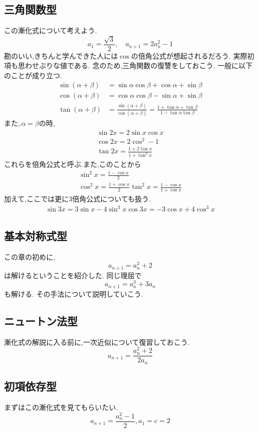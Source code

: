 \documentclass[dvipdfmx,a4paper,11pt,fleqn,openany]{jsbook}
\begin{document}
  \subsection{三角関数型}
    この漸化式について考えよう.
    \[
      a_1=\frac{\sqrt{3}}{2},\quad a_{n+1}=2a_n^2-1
    \]
    勘のいい,きちんと学んできた人には$\cos$の倍角公式が想起されるだろう.
    実際初項も思わせぶりな値である.
    念のため,三角関数の復讐をしておこう.
    一般に以下のことが成り立つ.
    \begin{align*}
      \sin (\alpha+\beta) &=\sin \alpha \cos \beta +\cos \alpha + \sin \beta\\
      \cos (\alpha+\beta) &=\cos \alpha \cos \beta -\sin \alpha + \sin \beta\\
      \tan (\alpha+\beta) &=\frac{\sin (\alpha+\beta)}{\cos (\alpha+\beta)}=\frac{1+\tan\alpha+\tan \beta}{1-\tan\alpha\tan\beta}
    \end{align*}
    また,\,$\alpha=\beta$の時,
    \begin{align*}
      \sin 2x =2\sin x \cos x\\
      \cos 2x =2\cos^2 -1\\
      \tan 2x =\frac{1+2\tan x}{1+\tan^2 x}
    \end{align*}
    これらを倍角公式と呼ぶ.また,このことから
    \begin{align*}
      \sin^2 x= \frac{1-\cos x}{2}\\
      \cos^2 x= \frac{1+\cos x}{2}
      \tan^2 x=\frac{1-\cos x}{1+\cos x}
    \end{align*}
    加えて,ここでは更に3倍角公式についても扱う.
    \begin{align*}
      \sin 3x = 3\sin x - 4 \sin^3 x
      \cos 3x = -3\cos x + 4\cos^3 x
    \end{align*} 
    

  \subsection{基本対称式型}
    この章の初めに,
    \[
      a_{n+1}=a_n^2+2
    \]
    は解けるということを紹介した.
    同じ理屈で
    \[
      a_{n+1}=a_n^3+3a_n
    \]
    も解ける.
    その手法について説明していこう.
  \subsection{ニュートン法型}
    漸化式の解説に入る前に,一次近似について復習しておこう.
    \[
      a_{n+1}=\frac{a_n^2+2}{2a_n}
    \]
  \subsection{初項依存型}
    まずはこの漸化式を見てもらいたい.
    \[
      a_{n+1}=\frac{a_n^2-1}{2},a_1=c=2
    \]
\end{document}
